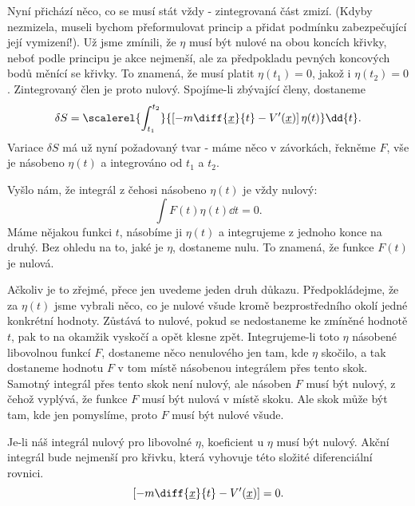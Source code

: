     Nyní přichází něco, co se musí stát vždy - zintegrovaná část zmizí. (Kdyby nezmizela, museli
    bychom přeformulovat princip a přidat podmínku zabezpečující její vymizení!). Už jsme zmínili,
    že \(\eta\) musí být nulové na obou koncích křivky, neboť podle principu je akce nejmenší, ale
    za předpokladu pevných koncových bodů měnící se křivky. To znamená, že musí platit \(\eta(t_1)
    =0\), jakož i \(\eta(t_2) = 0\). Zintegrovaný člen je proto nulový. Spojíme-li zbývající členy,
    dostaneme
    \begin{equation*}
      \delta S = \scalerel{\int^{t_2}_{t_1}}{
        \left[-m\diff{\underline{x}}{t} -V'(\underline{x})\right]\eta(t)
      }\dd{t}.
    \end{equation*} 
    Variace \(\delta S\) má už nyní požadovaný tvar - máme něco v závorkách, řekněme \(F\), vše je
    násobeno \(\eta(t)\) a integrováno od \(t_1\) a \(t_2\).

    Vyšlo nám, že integrál z čehosi násobeno \(\eta(t)\) je vždy nulový:
    \begin{equation*}
      \int F(t)\eta(t)\dd{t} = 0.
    \end{equation*} 
    Máme nějakou funkci \(t\), násobíme ji \(\eta(t)\) a integrujeme z jednoho konce na druhý. Bez
    ohledu na to, jaké je \(\eta\), dostaneme nulu. To znamená, že funkce \(F(t)\) je nulová.
    
    Ačkoliv je to zřejmé, přece jen uvedeme jeden druh důkazu. Předpokládejme, že za \(\eta(t)\)
    jsme vybrali něco, co je nulové všude kromě bezprostředního okolí jedné konkrétní hodnoty.
    Zůstává to nulové, pokud se nedostaneme ke zmíněné hodnotě \(t\), pak to na okamžik vyskočí a
    opět klesne zpět. Integrujeme-li toto \(\eta\) násobené libovolnou funkcí \(F\), dostaneme něco
    nenulového jen tam, kde \(\eta\) skočilo, a tak dostaneme hodnotu \(F\) v tom místě násobenou
    integrálem přes tento skok. Samotný integrál přes tento skok není nulový, ale násoben \(F\) musí
    být nulový, z čehož vyplývá, že funkce \(F\) musí být nulová v místě skoku. Ale skok může být
    tam, kde jen pomyslíme, proto \(F\) musí být nulové všude.  


    Je-li náš integrál nulový pro libovolné \(\eta\), koeficient u \(\eta\) musí být nulový. Akční
    integrál bude nejmenší pro křivku, která vyhovuje této složité diferenciální rovnici. 
    \begin{equation*}
      \left[-m\diff{\underline{x}}{t} -V'(\underline{x})\right] = 0.
    \end{equation*}  
    
